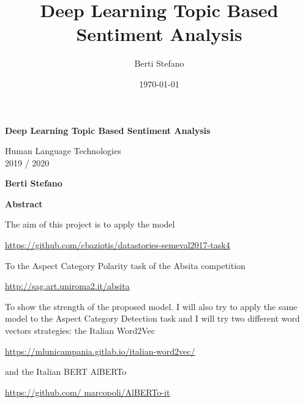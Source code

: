 \documentclass{article}
\title{Deep Learning Topic Based Sentiment Analysis}
\author{Berti Stefano}
\date{\today}
\begin{document}
    \thispagestyle{plain}
    \begin{center}
        \Large
        \textbf{Deep Learning Topic Based Sentiment Analysis}

        \vspace{0.4cm}
        \large Human Language Technologies
        \\2019 / 2020

        \vspace{0.4cm}
        \textbf{Berti Stefano}

        \vspace{0.9cm}
        \textbf{Abstract}
    \end{center}
    The aim of this project is to apply the model
    \\\centerline{\url{https://github.com/cbaziotis/datastories-semeval2017-task4}}
    To the Aspect Category Polarity task of the Absita competition
    \\\centerline{\url{http://sag.art.uniroma2.it/absita}}
    To show the strength of the proposed model.
    I will also try to apply the same model to the Aspect Category Detection task and I will try two different word
    vectors strategies: the Italian Word2Vec
    \\\centerline{\url{https://mlunicampania.gitlab.io/italian-word2vec/}} and the Italian BERT
    AlBERTo
    \\\centerline{\url{https://github.com/ marcopoli/AlBERTo-it}}
\end{document}
